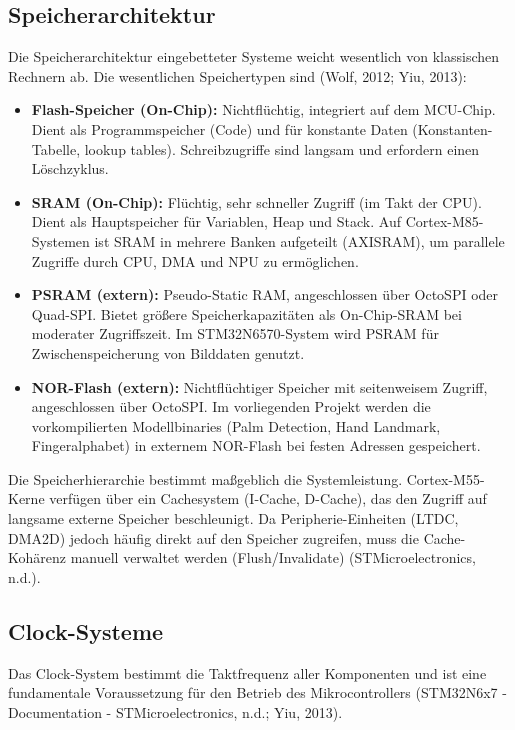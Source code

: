 \subsection{Speicherarchitektur}

Die Speicherarchitektur eingebetteter Systeme weicht wesentlich von klassischen Rechnern ab. Die wesentlichen Speichertypen sind (Wolf, 2012; Yiu, 2013):

\begin{itemize}
    \item \textbf{Flash-Speicher (On-Chip):} Nichtflüchtig, integriert auf dem MCU-Chip. Dient als Programmspeicher (Code) und für konstante Daten (Konstanten-Tabelle, lookup tables). Schreibzugriffe sind langsam und erfordern einen Löschzyklus.
    \item \textbf{SRAM (On-Chip):} Flüchtig, sehr schneller Zugriff (im Takt der CPU). Dient als Hauptspeicher für Variablen, Heap und Stack. Auf Cortex-M85-Systemen ist SRAM in mehrere Banken aufgeteilt (AXISRAM), um parallele Zugriffe durch CPU, DMA und NPU zu ermöglichen.
    \item \textbf{PSRAM (extern):} Pseudo-Static RAM, angeschlossen über OctoSPI oder Quad-SPI. Bietet größere Speicherkapazitäten als On-Chip-SRAM bei moderater Zugriffszeit. Im STM32N6570-System wird PSRAM für Zwischenspeicherung von Bilddaten genutzt.
    \item \textbf{NOR-Flash (extern):} Nichtflüchtiger Speicher mit seitenweisem Zugriff, angeschlossen über OctoSPI. Im vorliegenden Projekt werden die vorkompilierten Modellbinaries (Palm Detection, Hand Landmark, Fingeralphabet) in externem NOR-Flash bei festen Adressen gespeichert.
\end{itemize}

Die Speicherhierarchie bestimmt maßgeblich die Systemleistung. Cortex-M55-Kerne verfügen über ein Cachesystem (I-Cache, D-Cache), das den Zugriff auf langsame externe Speicher beschleunigt. Da Peripherie-Einheiten (LTDC, DMA2D) jedoch häufig direkt auf den Speicher zugreifen, muss die Cache-Kohärenz manuell verwaltet werden (Flush/Invalidate) (STMicroelectronics, n.d.).

\subsection{Clock-Systeme}

Das Clock-System bestimmt die Taktfrequenz aller Komponenten und ist eine fundamentale Voraussetzung für den Betrieb des Mikrocontrollers (STM32N6x7 - Documentation - STMicroelectronics, n.d.; Yiu, 2013).

